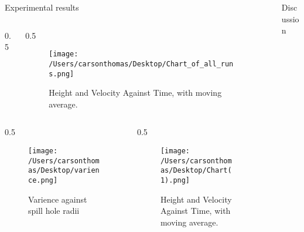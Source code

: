 \documentclass[final]{beamer}
\newlength{\sepwidth}
\newlength{\colwidth}
\newcommand{\separatorcolumn}{\begin{column}{\sepwidth}\end{column}}
\begin{document}
\begin{frame}[t]
\begin{columns}[t]
\begin{column}{\colwidth}
\begin{block}{Experimental results}
\begin{columns}[t]
\begin{column}{0.5\colwidth}
\end{column}
\hspace{10pt} %
\begin{column}{0.5\colwidth}
\vspace{0pt} %
       \begin{figure}
        \centering
        \texttt{[image: /Users/carsonthomas/Desktop/Chart\_of\_all\_runs.png]}
        \caption{Height and Velocity Against Time, with moving average.}
        \label{fig:Figure 2}
    \end{figure}
  \end{column}
\end{columns}
\begin{columns}[t]
\hspace{20pt} %
\begin{column}{0.5\colwidth}
   \begin{figure}
        \centering
        \texttt{[image: /Users/carsonthomas/Desktop/varience.png]}
        \caption{Varience against spill hole radii}
        \label{fig:example}
    \end{figure}
\end{column}
\hspace{10pt} %
\begin{column}{0.5\colwidth}
\vspace{0pt} %
     \begin{figure}
        \centering
        \texttt{[image: /Users/carsonthomas/Desktop/Chart(1).png]}
        \caption{Height and Velocity Against Time, with moving average.}
        \label{fig:Figure 3}
    \end{figure}

  \end{column}
\end{columns}
       
  \end{block}



\end{column}

\separatorcolumn

\begin{column}{\colwidth}

  \begin{block}{Discussion}


\end{block}
\end{column}
\end{columns}
\end{frame}
\end{document}
